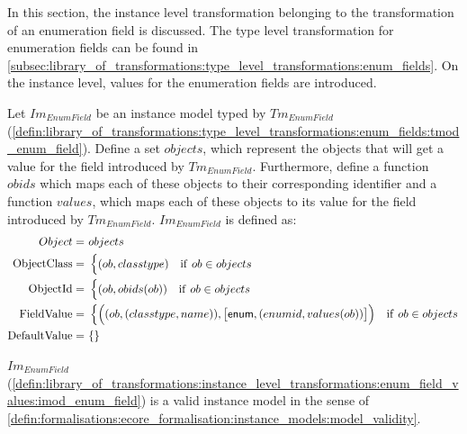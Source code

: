 In this section, the instance level transformation belonging to the transformation of an enumeration field is discussed. The type level transformation for enumeration fields can be found in \cref{subsec:library_of_transformations:type_level_transformations:enum_fields}. On the instance level, values for the enumeration fields are introduced.

\begin{defin}
\label{defin:library_of_transformations:instance_level_transformations:enum_field_values:imod_enum_field}
Let $Im_{EnumField}$ be an instance model typed by $Tm_{EnumField}$ (\cref{defin:library_of_transformations:type_level_transformations:enum_fields:tmod_enum_field}). Define a set $objects$, which represent the objects that will get a value for the field introduced by $Tm_{EnumField}$. Furthermore, define a function $obids$ which maps each of these objects to their corresponding identifier and a function $values$, which maps each of these objects to its value for the field introduced by $Tm_{EnumField}$. $Im_{EnumField}$ is defined as:
\begin{align*}
Object =\ &objects \\
\mathrm{ObjectClass} =\ & \begin{cases}
    (ob, classtype) & \mathrm{if }\ ob \in objects
\end{cases}\\
\mathrm{ObjectId} =\ & \begin{cases}
    (ob, obids(ob)) & \mathrm{if }\ ob \in objects
\end{cases}\\
\mathrm{FieldValue} =\ & \begin{cases}
    \Big((ob, (classtype, name)), \big[\mathsf{enum}, (enumid, values(ob))\big]\Big) & \mathrm{if }\ ob \in objects
\end{cases} \\
\mathrm{DefaultValue} =\ & \{\}
\end{align*}
\end{defin}

\begin{thm}
\label{defin:library_of_transformations:instance_level_transformations:enum_field_values:imod_enum_field_correct}
$Im_{EnumField}$ (\cref{defin:library_of_transformations:instance_level_transformations:enum_field_values:imod_enum_field}) is a valid instance model in the sense of \cref{defin:formalisations:ecore_formalisation:instance_models:model_validity}.
\end{thm}

